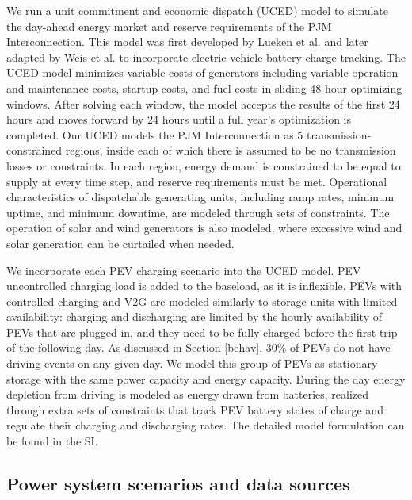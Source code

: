 \documentclass[9pt,twocolumn,twoside,lineno]{pnas-new}
\begin{document}
{We run a unit commitment and economic dispatch (UCED) model to simulate the day-ahead energy market and reserve requirements of the PJM Interconnection. This model was first developed by Lueken et al. \cite{lueken_effects_2014} and later adapted by Weis et al. \cite{weis_emissions_2015,weis_consequential_2016} to incorporate electric vehicle battery charge tracking. The UCED model minimizes variable costs of generators including variable operation and maintenance costs, startup costs, and fuel costs in sliding 48-hour optimizing windows. After solving each window, the model accepts the results of the first 24 hours and moves forward by 24 hours until a full year's optimization is completed. Our UCED models the PJM Interconnection as 5 transmission-constrained regions, inside each of which there is assumed to be no transmission losses or constraints. In each region, energy demand is constrained to be equal to supply at every time step, and reserve requirements must be met. Operational characteristics of dispatchable generating units, including ramp rates, minimum uptime, and minimum downtime, are modeled through sets of constraints. The operation of solar and wind generators is also modeled, where excessive wind and solar generation can be curtailed when needed. 

We incorporate each PEV charging scenario into the UCED model. PEV uncontrolled charging load is added to the baseload, as it is inflexible. PEVs with controlled charging and V2G are modeled similarly to storage units with limited availability: charging and discharging are limited by the hourly availability of PEVs that are plugged in, and they need to be fully charged before the first trip of the following day. As discussed in Section \ref{behav}, 30\% of PEVs do not have driving events on any given day. We model this group of PEVs as stationary storage with the same power capacity and energy capacity. During the day energy depletion from driving is modeled as energy drawn from batteries, realized through extra sets of constraints that track PEV battery states of charge and regulate their charging and discharging rates. The detailed model formulation can be found in the SI.

\subsection{Power system scenarios and data sources}\label{gridscenario}

}
\end{document}
